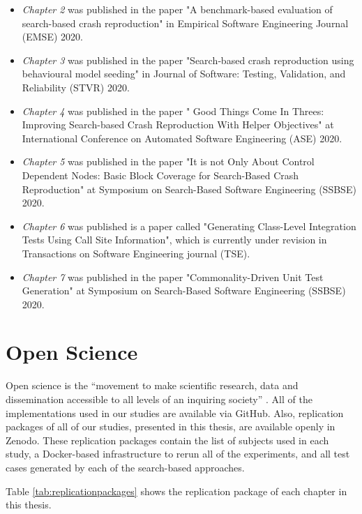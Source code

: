 \begin{itemize}
    \item \textit{Chapter 2} was published in the paper "A benchmark-based evaluation of search-based crash reproduction" in Empirical Software Engineering Journal (EMSE) 2020.
    \item \textit{Chapter 3} was published in the paper "Search‐based crash reproduction using behavioural model seeding" in Journal of Software: Testing, Validation, and Reliability (STVR) 2020.
    \item \textit{Chapter 4} was published in the paper " Good Things Come In Threes: Improving Search-based Crash Reproduction With Helper Objectives" at International Conference on Automated Software Engineering (ASE) 2020.
    \item \textit{Chapter 5} was published in the paper "It is not Only About Control Dependent Nodes: Basic Block Coverage for Search-Based Crash Reproduction" at Symposium on Search-Based Software Engineering (SSBSE) 2020.
    \item \textit{Chapter 6} was published is a paper called "Generating Class-Level Integration Tests Using Call Site Information", which is currently under revision in Transactions on Software Engineering journal (TSE).
    \item \textit{Chapter 7} was published in the paper "Commonality-Driven Unit Test Generation" at Symposium on Search-Based Software Engineering (SSBSE) 2020.
  \end{itemize}

\section{Open Science}
\label{sec:intro:open}
Open science is the “movement to make scientific research, data and dissemination accessible to all levels of an inquiring society” \cite{Open_science}. All of the implementations used in our studies are available via GitHub. Also, replication packages of all of our studies, presented in this thesis, are available openly in Zenodo. These replication packages contain the list of subjects used in each study, a Docker-based infrastructure to rerun all of the experiments, and all test cases generated by each of the search-based approaches.

Table \ref{tab:replicationpackages} shows the replication package of each chapter in this thesis.


